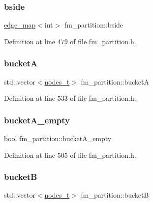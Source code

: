 \subsubsection{\texorpdfstring{bside}{bside}}
{\footnotesize\ttfamily \mbox{\hyperlink{classedge__map}{edge\+\_\+map}}$<$int$>$ fm\+\_\+partition\+::bside\hspace{0.3cm}{\ttfamily [protected]}}



Definition at line 479 of file fm\+\_\+partition.\+h.

\mbox{\label{classfm__partition_a399955e0c84bad93cb82b5ffe8cf4a04}} 
\subsubsection{\texorpdfstring{bucketA}{bucketA}}
{\footnotesize\ttfamily std\+::vector$<$\mbox{\hyperlink{edge_8h_a22ac17689106ba21a84e7bc54d1199d6}{nodes\+\_\+t}}$>$ fm\+\_\+partition\+::bucketA\hspace{0.3cm}{\ttfamily [protected]}}



Definition at line 533 of file fm\+\_\+partition.\+h.

\mbox{\label{classfm__partition_a4df2f0f6f4686ba187c2be39ce3b29cc}} 
\subsubsection{\texorpdfstring{bucket\+A\+\_\+empty}{bucketA\_empty}}
{\footnotesize\ttfamily bool fm\+\_\+partition\+::bucket\+A\+\_\+empty\hspace{0.3cm}{\ttfamily [protected]}}



Definition at line 505 of file fm\+\_\+partition.\+h.

\mbox{\label{classfm__partition_ae6a5b5f3f2d95ea229882e861ccfc9e4}} 
\subsubsection{\texorpdfstring{bucketB}{bucketB}}
{\footnotesize\ttfamily std\+::vector$<$\mbox{\hyperlink{edge_8h_a22ac17689106ba21a84e7bc54d1199d6}{nodes\+\_\+t}}$>$ fm\+\_\+partition\+::bucketB\hspace{0.3cm}{\ttfamily [protected]}}



